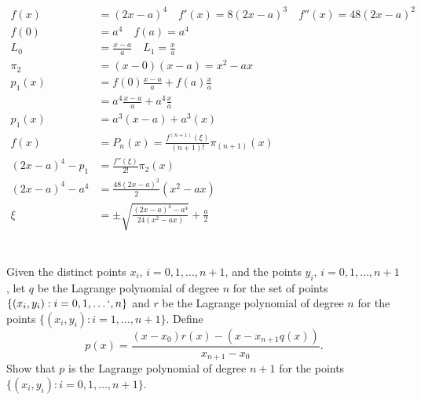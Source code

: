 \documentclass{article}
\begin{document}
\begin{align*}
    f(x) &=(2x-a)^4 \quad f'(x)= 8(2x-a)^3 \quad f''(x) = 48(2x-a)^2\\
    f(0) &= a^4 \quad f(a)=a^4\\
    L_0 &= \frac{x-a}{a} \quad L_1 = \frac{x}{a}\\
    \pi_2 &=(x-0)(x-a) = x^2-ax\\
    p_1(x) &= f(0) \frac{x-a}{a} + f(a) \frac{x}{a}\\
    &= a^4 \frac{x-a}{a} + a^4 \frac{x}{a}\\
    p_1(x) &= a^3(x-a) + a^3(x)\\
    f(x) &= P_n(x) = \frac{f^{(n+1)}(\xi)}{(n+1)!}\pi_{(n+1)}(x)\\
    (2x-a)^4 - p_1 &= \frac{f''(\xi)}{2!}\pi_2(x)\\
    (2x-a)^4 - a^4 &= \frac{48(2x-a)^2}{2}(x^2-ax)\\
    \xi &= \pm \sqrt{\frac{(2x-a)^4-a^4}{24(x^2-ax)}}+\frac{a}{2}
\end{align*}

\section{}
 Given the distinct points $x_i$, $i = 0, 1,\dots, n + 1$, and the points $y_i$, $i = 0, 1, \dots , n + 1$, let $q$ be the Lagrange polynomial of degree $n$ for the set of points $\{(x_i, y_i) : i = 0, 1, \dots` , n\}$ and $r$ be the Lagrange polynomial of degree $n$ for the points $\{(x_i, y_i) : i = 1,\dots, n + 1\}$. Define
 \begin{equation*}
     p(x) = \frac{(x-x_0)r(x)-(x-x_{n+1}q(x))}{x_{n+1}-x_0}.
 \end{equation*}
 Show that $p$ is the Lagrange polynomial of degree $n+1$ for the points $\{(x_i,y_i): i =0,1,\dots, n+1 \}$.
\vspace{10mm}
\end{document}

